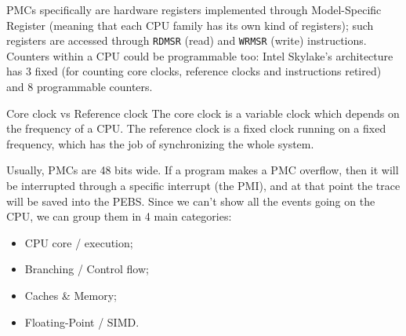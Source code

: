 PMCs specifically are hardware registers implemented through Model-Specific Register (meaning that each CPU family has its own kind of registers); such registers are accessed through \verb|RDMSR| (read) and \verb|WRMSR| (write) instructions. Counters within a CPU could be programmable too: Intel Skylake's architecture has 3 fixed (for counting core clocks, reference clocks and instructions retired) and 8 programmable counters. 

\begin{definition}{Core clock vs Reference clock}
    The core clock is a variable clock which depends on the frequency of a CPU. The reference clock is a fixed clock running on a fixed frequency, which has the job of synchronizing the whole system.
\end{definition}

Usually, PMCs are 48 bits wide. If a program makes a PMC overflow, then it will be interrupted through a specific interrupt (the PMI), and at that point the trace will be saved into the PEBS.
\nwl
Since we can't show all the events going on the CPU, we can group them in 4 main categories:
\begin{itemize}
    \item CPU core / execution;
    \item Branching / Control flow;
    \item Caches & Memory;
    \item Floating-Point / SIMD.
\end{itemize}